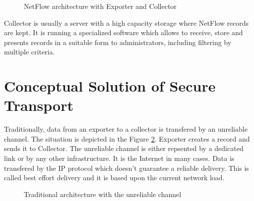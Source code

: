 \documentclass[11pt,a4paper]{article}
\begin{document}
\begin{figure}[h]
  \begin{center}
    \caption{NetFlow architecture with Exporter and Collector}
    \label{exporters}
  \end{center}
\end{figure}

Collector is usually a server with a high capacity storage where NetFlow records are kept. It is running a specialized software which allows to receive, store and presents records in a suitable form to administrators, including filtering by multiple criteria.

\section{Conceptual Solution of Secure Transport} 

Traditionally, data from an exporter to a collector is transfered by an unreliable channel. The situation is depicted in the Figure \ref{trad-arch}. Exporter creates a record and sends it to Collector. The unreliable channel is either repsented by a dedicated link or by any other infrastructure. It is the Internet in many cases. Data is transfered by the IP protocol which doesn't guarantee a reliable delivery. This is called best effort delivery and it is based upon the current network load. 

\begin{figure}[h]
  \begin{center}
    \caption{Traditional architecture with the unreliable channel}
    \label{trad-arch}
  \end{center}
\end{figure}
\end{document}
